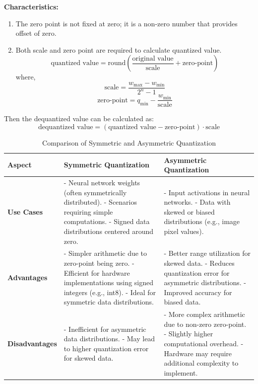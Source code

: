 \textbf{Characteristics:}
\begin{enumerate}
    \item The zero point is not fixed at zero; it is a non-zero number that provides offset of zero.
    \item Both scale and zero point are required to calculate quantized value.
    \[
        \text{quantized value} = \text{round}\left(\frac{\text{original value}}{\text{scale}} + \text{zero-point}\right)
    \]
    where,
        \[
            \text{scale} = \frac{w_{\text{max}} - w_{\text{min}}}{2^n - 1}
        \]
        \[
            \text{zero-point} = q_{\text{min}} - \frac{w_{\text{min}}}{\text{scale}}
        \]
\end{enumerate}

Then the dequantized value can be calculated as:
\[ \text{dequantized value} = (\text{quantized value} - \text{zero-point}) \cdot \text{scale} \]

\begin{table}[H]
    \centering
    \caption{Comparison of Symmetric and Asymmetric Quantization}
    \label{tab:quantization_comparison}
    \begin{tabularx}{\textwidth}{|l|X|X|}
    \hline
    \textbf{Aspect} & \textbf{Symmetric Quantization} & \textbf{Asymmetric Quantization} \\ \hline
    \textbf{Use Cases} &
    - Neural network weights (often symmetrically distributed). \newline
    - Scenarios requiring simple computations. \newline
    - Signed data distributions centered around zero. &
    - Input activations in neural networks. \newline
    - Data with skewed or biased distributions (e.g., image pixel values).\\ \hline
    
    \textbf{Advantages} &
    - Simpler arithmetic due to zero-point being zero. \newline
    - Efficient for hardware implementations using signed integers (e.g., int8). \newline
    - Ideal for symmetric data distributions. &
    - Better range utilization for skewed data. \newline
    - Reduces quantization error for asymmetric distributions. \newline
    - Improved accuracy for biased data. \\ \hline
    
    \textbf{Disadvantages} &
    - Inefficient for asymmetric data distributions. \newline
    - May lead to higher quantization error for skewed data. &
    - More complex arithmetic due to non-zero zero-point. \newline
    - Slightly higher computational overhead. \newline
    - Hardware may require additional complexity to implement. \\ \hline
    \end{tabularx}
\end{table}

